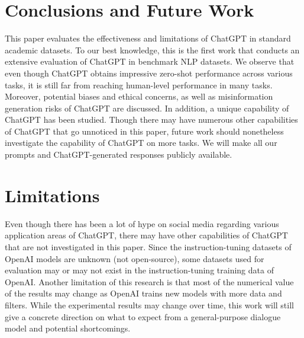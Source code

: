 \documentclass[11pt]{article}
\begin{document}
 \section{Conclusions and Future Work}

This paper evaluates the effectiveness and limitations of ChatGPT in standard academic datasets. To our best knowledge, this is the first work that conducts an extensive evaluation of ChatGPT in benchmark NLP datasets. We observe that even though ChatGPT obtains impressive zero-shot performance across various tasks, it is still far from reaching human-level performance in many tasks. Moreover, potential biases and ethical concerns, as well as  misinformation generation risks of ChatGPT are discussed. In addition, a unique capability of ChatGPT has been studied. Though there may have  numerous other capabilities of ChatGPT that go unnoticed in this paper, future work should nonetheless investigate the capability of ChatGPT on more tasks. We will make all our prompts and 
ChatGPT-generated responses publicly available. 

\section{Limitations}
Even though there has been a lot of hype on social media regarding various application areas of ChatGPT, there may have other capabilities of ChatGPT that are not investigated in this paper. Since the instruction-tuning datasets of OpenAI models are unknown (not open-source), some datasets used for evaluation may or may not exist in the instruction-tuning training data of OpenAI.   Another limitation of this research is that most of the numerical value of the results may change as OpenAI trains new models with more data and filters. While the experimental results may change over time, this work will still give a concrete direction on what to expect from a general-purpose dialogue model and potential shortcomings.  
\end{document}
